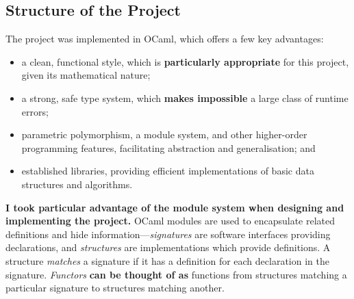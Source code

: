 \documentclass[12pt,a4paper,twoside,openright]{report}
\begin{document}
\subsection{Structure of the Project}
The project was implemented in OCaml, which
offers a few key advantages:
\begin{itemize}
	\item a clean, functional
	style, which is \textbf{particularly appropriate} for
	this project, given its mathematical nature;
	\item a strong, safe type system, which \textbf{makes
	impossible} a large class of runtime errors;
	\item parametric polymorphism, a module system,
	and other higher-order programming features,
	facilitating abstraction and generalisation; and
	\item established libraries, providing efficient
	implementations of basic data structures and algorithms.
\end{itemize}
\textbf{I took particular advantage of the module system when
designing and implementing the project.} OCaml modules
are used to encapsulate related definitions and hide
information---\emph{signatures} are software interfaces
providing declarations,
and \emph{structures} are implementations which 
provide definitions. A structure \emph{matches} a
signature if it has a definition for each declaration
in the signature. \emph{Functors} \textbf{can be thought of
as} functions from structures matching a
particular signature to structures matching another.
\end{document}
